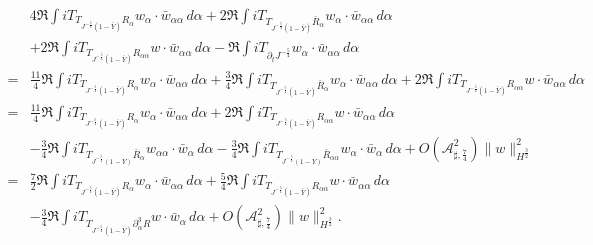 \documentclass[10pt]{amsart}
\theoremstyle{remark}
\theoremstyle{definition}
\numberwithin{equation}{section}
\newcommand{\al}{\alpha}
\newcommand{\f}{\frac}
\newcommand{\ASSharp}{{\mathcal{A}_{\sharp,\frac{7}{4}}^2}}
\begin{document}
\begin{align*}
&4\Re \int i T_{T_{J^{-\f54}(1-\bar{Y})}R_{\al}}w_\al \cdot \bar{w}_{\al \al} \,d\al 
+2\Re \int i T_{T_{J^{-\f54}(1-\bar{Y})}\bar{R}_{\al}}w_\al \cdot \bar{w}_{\al \al} \,d\al \\
&+ 2\Re \int i T_{T_{J^{-\f54}(1-\bar{Y})}R_{\al\al}}w \cdot \bar{w}_{\al \al} \,d\al-\Re \int iT_{\partial_tJ^{-\f54}}w_{\al}\cdot \bar{w}_{\al \al} \,d\alpha \\
=&\frac{11}{4}\Re \int i T_{T_{J^{-\f54}(1-\bar{Y})}R_{\al}}w_\al \cdot \bar{w}_{\al \al} \,d\al 
+\f34\Re \int i T_{T_{J^{-\f54}(1-\bar{Y})}\bar{R}_{\al}}w_\al \cdot \bar{w}_{\al \al} \,d\al+ 2\Re \int i T_{T_{J^{-\f54}(1-\bar{Y})}R_{\al\al}}w \cdot \bar{w}_{\al \al} \,d\al\\
=& \frac{11}{4}\Re \int i T_{T_{J^{-\f54}(1-\bar{Y})}R_{\al}}w_\al \cdot \bar{w}_{\al \al} \,d\al  + 2\Re \int i T_{T_{J^{-\f54}(1-\bar{Y})}R_{\al\al}}w \cdot \bar{w}_{\al \al} \,d\al \\
&- \f34\Re \int i T_{T_{J^{-\f54}(1-Y)}\bar{R}_{\al}}w_{\al\al} \cdot \bar{w}_{\al} \,d\al - \f34\Re \int i T_{T_{J^{-\f54}(1-Y)}\bar{R}_{\al \al}}w_\al \cdot \bar{w}_{\al } \,d\al+ O\left(\ASSharp \right) \| w\|^2_{H^\f32} \\
=& \frac{7}{2}\Re \int i T_{T_{J^{-\f54}(1-\bar{Y})}R_{\al}}w_\al \cdot \bar{w}_{\al \al} \,d\al + \f54\Re \int i T_{T_{J^{-\f54}(1-\bar{Y})}R_{\al\al}}w \cdot \bar{w}_{\al \al} \,d\al \\
&- \f34\Re \int i T_{T_{J^{-\f54}(1-\bar{Y})}\partial_\al^3 R}w \cdot \bar{w}_{\al } \,d\al+ O\left(\ASSharp \right) \| w\|^2_{H^\f32}.
\end{align*}
\end{document}
